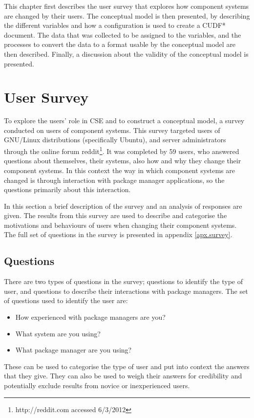 This chapter first describes the user survey that explores how component systems are changed by their users.
The conceptual model is then presented, by describing the different variables and how a configuration is used to create a CUDF* document.
The data that was collected to be assigned to the variables, and the processes to convert the data to a format usable by the conceptual model are then described.
Finally, a discussion about the validity of the conceptual model is presented.

\section{User Survey}
\label{strat.usersurvey}
To explore the users' role in CSE and to construct a conceptual model, a survey conducted on users of component systems.
This survey targeted users of GNU/Linux distributions (specifically Ubuntu), and server administrators through the online forum reddit\footnote{http://reddit.com accessed 6/3/2012}.
It was completed by 59 users, who answered questions about themselves, their systems, also how and why they change their component systems.
In this context the way in which component systems are changed is through interaction with package manager applications, 
so the questions primarily about this interaction.

In this section a brief description of the survey and an analysis of responses are given.
The results from this survey are used to describe and categorise the motivations and behaviours of users when changing their component systems.
The full set of questions in the survey is presented in appendix \ref{apx.survey}. 

\subsection{Questions}
There are two types of questions in the survey; questions to identify the type of user, and questions to describe their interactions with package managers.
The set of questions used to identify the user are:
\begin{itemize}
  \item How experienced with package managers are you? 
  \item What system are you using?
  \item What package manager are you using?
\end{itemize}
These can be used to categorise the type of user and put into context the answers that they give.
They can also be used to weigh their answers for credibility and potentially exclude results from novice or inexperienced users. 

